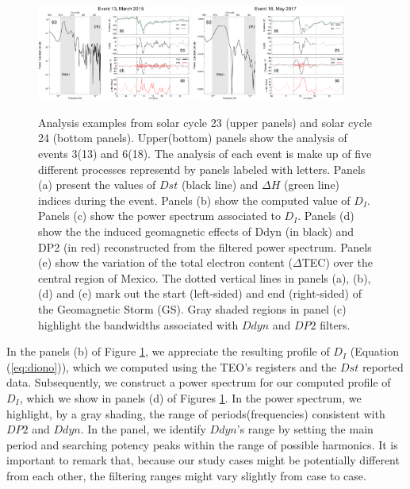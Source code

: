 \documentclass[a4paper,fleqn]{cas-dc}
\begin{document}
\begin{figure}[h!]
	\centerline{\Large \bf   
	\hspace{0.26\textwidth}  \color{black}{}
	\hspace{0.31\textwidth}  \color{black}{}
	\hfill}	   
	\includegraphics[width=0.45\textwidth]{images/diono/iono_PI_2015-03-15.eps}
    \includegraphics[width=0.45\textwidth]{images/diono/iono_PI_2017-05-26.eps}   	
    
    
	\caption{Analysis examples from solar cycle 23 (upper panels) and solar cycle 24 (bottom panels). Upper(bottom) panels show the analysis of events 3(13) and 6(18). The analysis of each event is make up of five different processes representd by panels labeled with letters. Panels (a) present the values of $Dst$ (black line) and $\Delta H$ (green line) indices during the event. Panels (b) show the computed value of $D_I$. Panels (c) show the power spectrum associated to $D_I$. Panels (d) show the the induced geomagnetic effects of Ddyn (in black) and DP2 (in red) reconstructed from the filtered power spectrum. Panels (e) show the variation of the total electron content ($\Delta$TEC) over the central region of Mexico. The dotted vertical lines in panels (a), (b), (d) and (e) mark out the start (left-sided) and end (right-sided) of the Geomagnetic Storm (GS). Gray shaded regions in panel (c) highlight the bandwidths associated with $Ddyn$ and $DP2$ filters.}
	\label{fig:iono_resp}
\end{figure}




In the panels (b) of Figure \ref{fig:iono_resp}, we appreciate the resulting profile of $D_I$ (Equation (\ref{eq:diono})), which we computed using the TEO's registers and the $Dst$ reported data. Subsequently, we construct a power spectrum for our computed profile of $D_I$, which we show in panels (d) of Figures \ref{fig:iono_resp}. In the power spectrum, we highlight, by a gray shading, the range of periods(frequencies) consistent with $DP2$ and $Ddyn$. In the panel, we identify $Ddyn$'s range by setting the main period and searching potency peaks within the range of possible harmonics. It is important to remark that, because our study cases might be potentially different from each other, the filtering ranges might vary slightly from case to case.
\end{document}
